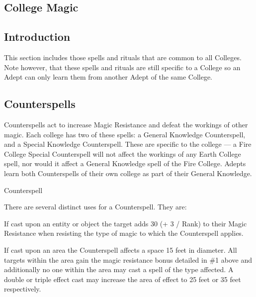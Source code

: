 \begin{multicols}{3}

\section{College Magic}
\label{college:rituals|(}

\subsection{Introduction}

This section includes those spells and rituals that are common to all
Colleges.  Note however, that these spells and rituals are still
specific to a College so an Adept can only learn them from another
Adept of the same College.

\subsection{Counterspells}
\label{magic:counterspells}

Counterspells act to increase Magic Resistance and defeat the workings
of other magic. Each college has two of these spells: a General
Knowledge Counterspell, and a Special Knowledge Counterspell. These
are specific to the college --- a Fire College Special Counterspell
will not affect the workings of any Earth College spell, nor would it
affect a General Knowledge spell of the Fire College. Adepts learn
both Counterspells of their own college as part of their General
Knowledge.

\begin{spell}{Counterspell}

\begin{effects}
There are several distinct uses for a Counterspell. They are:
\begin{Enumerate}
\item If cast upon an entity or object the target adds 30 (+ 3 / Rank)
to their Magic Resistance when resisting the type of magic to which
the Counterspell applies.

\item If cast upon an area the Counterspell affects a space 15 feet in
diameter. All targets within the area gain the magic resistance bonus
detailed in \#1 above and additionally no one within the area may cast
a spell of the type affected. A double or triple effect cast may
increase the area of effect to 25 feet or 35 feet respectively.


\end{Enumerate}
\end{effects}
\end{spell}
\end{multicols}
